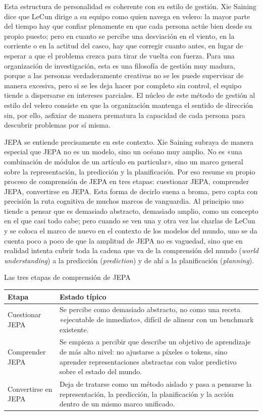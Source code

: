\documentclass[a4paper,12pt]{article}
\begin{document}
Esta estructura de personalidad es coherente con su estilo de gestión. Xie Saining dice que LeCun dirige a su equipo como quien navega en velero: la mayor parte del tiempo hay que confiar plenamente en que cada persona actúe bien desde su propio puesto; pero en cuanto se percibe una desviación en el viento, en la corriente o en la actitud del casco, hay que corregir cuanto antes, en lugar de esperar a que el problema crezca para tirar de vuelta con fuerza. Para una organización de investigación, esta es una filosofía de gestión muy madura, porque a las personas verdaderamente creativas no se les puede supervisar de manera excesiva, pero si se les deja hacer por completo sin control, el equipo tiende a dispersarse en intereses parciales. El núcleo de este método de gestión al estilo del velero consiste en que la organización mantenga el sentido de dirección sin, por ello, asfixiar de manera prematura la capacidad de cada persona para descubrir problemas por sí misma.

JEPA se entiende precisamente en este contexto. Xie Saining subraya de manera especial que JEPA no es un modelo, sino un océano muy amplio. No es «una combinación de módulos de un artículo en particular», sino un marco general sobre la representación, la predicción y la planificación. Por eso resume su propio proceso de comprensión de JEPA en tres etapas: cuestionar JEPA, comprender JEPA, convertirse en JEPA. Esta forma de decirlo suena a broma, pero capta con precisión la ruta cognitiva de muchos marcos de vanguardia. Al principio uno tiende a pensar que es demasiado abstracto, demasiado amplio, como un concepto en el que casi todo cabe; pero cuando se ven una y otra vez las charlas de LeCun y se coloca el marco de nuevo en el contexto de los modelos del mundo, uno se da cuenta poco a poco de que la amplitud de JEPA no es vaguedad, sino que en realidad intenta cubrir toda la cadena que va de la comprensión del mundo (\textit{world understanding}) a la predicción (\textit{prediction}) y de ahí a la planificación (\textit{planning}).

\begin{importantbox}{Las tres etapas de comprensión de JEPA}
\begin{tabularx}{\textwidth}{>{\raggedright\arraybackslash}p{} Y}
\toprule
Etapa & Estado típico \\
\midrule
Cuestionar JEPA & Se percibe como demasiado abstracto, no como una receta «ejecutable de inmediato», difícil de alinear con un benchmark existente. \\
Comprender JEPA & Se empieza a percibir que describe un objetivo de aprendizaje de más alto nivel: no ajustarse a píxeles o tokens, sino aprender representaciones abstractas con valor predictivo sobre el estado del mundo. \\
Convertirse en JEPA & Deja de tratarse como un método aislado y pasa a pensarse la representación, la predicción, la planificación y la acción dentro de un mismo marco unificado. \\
\bottomrule
\end{tabularx}
\end{importantbox}
\end{document}
